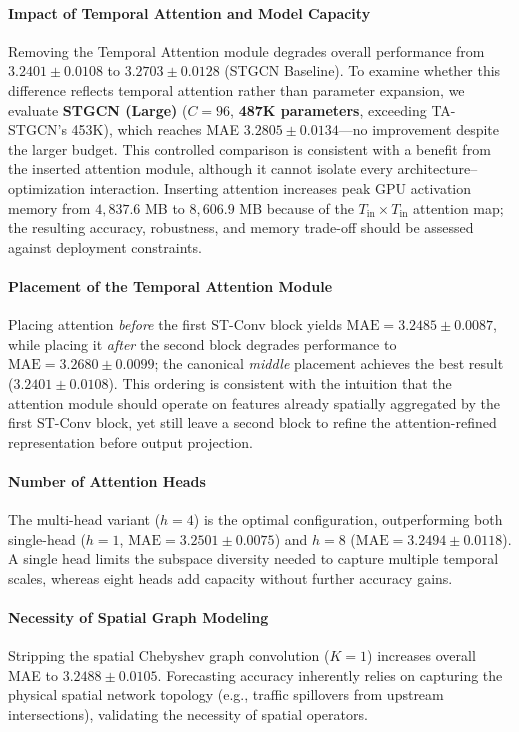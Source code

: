 \documentclass[preprint,12pt]{elsarticle}
\begin{document}
\paragraph{Impact of Temporal Attention and Model Capacity} Removing the Temporal Attention module degrades overall performance from $3.2401 \pm 0.0108$ to $3.2703 \pm 0.0128$ (STGCN Baseline). To examine whether this difference reflects temporal attention rather than parameter expansion, we evaluate \textbf{STGCN (Large)} ($C=96$, \textbf{487K parameters}, exceeding TA-STGCN's 453K), which reaches MAE $3.2805 \pm 0.0134$---no improvement despite the larger budget. This controlled comparison is consistent with a benefit from the inserted attention module, although it cannot isolate every architecture--optimization interaction. Inserting attention increases peak GPU activation memory from $4,837.6$ MB to $8,606.9$ MB because of the $T_{\text{in}} \times T_{\text{in}}$ attention map; the resulting accuracy, robustness, and memory trade-off should be assessed against deployment constraints.

\paragraph{Placement of the Temporal Attention Module} Placing attention \emph{before} the first ST-Conv block yields $\text{MAE} = 3.2485 \pm 0.0087$, while placing it \emph{after} the second block degrades performance to $\text{MAE} = 3.2680 \pm 0.0099$; the canonical \emph{middle} placement achieves the best result ($3.2401 \pm 0.0108$). This ordering is consistent with the intuition that the attention module should operate on features already spatially aggregated by the first ST-Conv block, yet still leave a second block to refine the attention-refined representation before output projection.

\paragraph{Number of Attention Heads} The multi-head variant ($h=4$) is the optimal configuration, outperforming both single-head ($h=1$, $\text{MAE} = 3.2501 \pm 0.0075$) and $h=8$ ($\text{MAE} = 3.2494 \pm 0.0118$). A single head limits the subspace diversity needed to capture multiple temporal scales, whereas eight heads add capacity without further accuracy gains.

\paragraph{Necessity of Spatial Graph Modeling} Stripping the spatial Chebyshev graph convolution ($K=1$) increases overall MAE to $3.2488 \pm 0.0105$. Forecasting accuracy inherently relies on capturing the physical spatial network topology (e.g., traffic spillovers from upstream intersections), validating the necessity of spatial operators.
\end{document}
